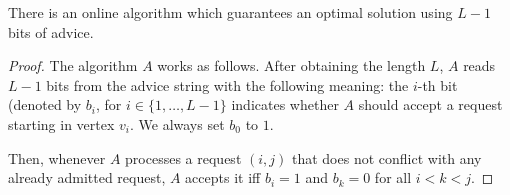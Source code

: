 \begin{theorem}\label{theorem:dpa-optimal}
    There is an online algorithm which guarantees an optimal solution
    using $L-1$ bits of advice.
\end{theorem}

\begin{proof}
    The algorithm $A$ works as follows. After obtaining the length $L$,
    $A$ reads $L-1$ bits from the advice string with the following
    meaning: the $i$-th bit (denoted by $b_i$, for $i \in \{1, \dots,
    L-1\}$ indicates whether $A$ should accept a request starting in
    vertex $v_i$. We always set $b_0$ to $1$.

    Then, whenever $A$ processes a request $(i, j)$ that does not conflict
    with any already admitted request, $A$ accepts it iff $b_i = 1$ and
    $b_k = 0$ for all $i < k < j$.
\end{proof}
